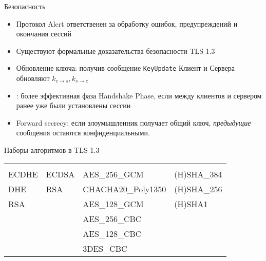 \documentclass[usenames,dvipsnames,8pt,aspectratio=169]{beamer}
\begin{document}
\begin{frame}{Безопасность}
	\Large
	\begin{itemize}
		\itemsep 8pt
		\item {\color{Orange} Протокол Alert } ответственен за обработку ошибок, предупреждений и окончания сессий  
		\item Существуют формальные доказательства безопасности  TLS 1.3 
		\item {\color{Orange} Обновление ключа:} получив сообщение \texttt{KeyUpdate} Клиент и Сервера обновляют $k_{c\rightarrow s}, k_{s\rightarrow c}$
		\item {\color{Orange}{Возобновление сессии (Pre-shared key handshake)}}: более эффективная фаза Handshake Phase, если между клиентов и сервером ранее уже были установлены сессии
		\item {\color{Orange}Forward secrecy:} если злоумышленник получает общий ключ, \emph{предыдущие} сообщения остаются конфиденциальными.
	\end{itemize}
\end{frame}


\begin{frame}{Наборы алгоритмов в TLS 1.3}
\Large
		\begin{tabular}{l l l l }
		\hspace{-20pt}	\textbf{\color{Orange}{Обмен ключами}} & \textbf{\color{Orange}{Сертификаты}} & \textbf{\color{Orange}{Сим. шифрование }} & \textbf{\color{Orange}{Хэш-функции}} \\[10pt]
		\hspace{-20pt}	ECDHE & ECDSA & AES\_256\_GCM & (H)SHA\_384 \\[5pt]
		\hspace{-20pt}	DHE & RSA & CHACHA20\_Poly1350 & (H)SHA\_256 \\[5pt]
		\hspace{-20pt}	{\color{gray}RSA} &  & AES\_128\_GCM & (H)SHA1 \\[15pt]
		\hspace{-20pt}	 &  & AES\_256\_CBC &  \\[5pt]
		\hspace{-20pt}	 &  & AES\_128\_CBC &  \\[15pt]
		\hspace{-20pt}	 &  & {\color{gray}3DES\_CBC} &  \\[10pt]
		\end{tabular}
\end{frame}
\end{document}
